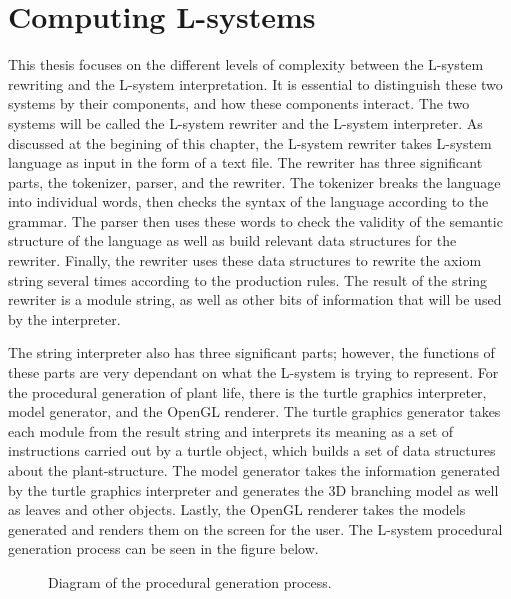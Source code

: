 \section{Computing L-systems}

This thesis focuses on the different levels of complexity between the L-system rewriting and the L-system interpretation. It is essential to distinguish these two systems by their components, and how these components interact. The two systems will be called the L-system rewriter and the L-system interpreter. As discussed at the begining of this chapter, the L-system rewriter takes L-system language as input in the form of a text file. The rewriter has three significant parts, the tokenizer, parser, and the rewriter. The tokenizer breaks the language into individual words, then checks the syntax of the language according to the grammar. The parser then uses these words to check the validity of the semantic structure of the language as well as build relevant data structures for the rewriter. Finally, the rewriter uses these data structures to rewrite the axiom string several times according to the production rules. The result of the string rewriter is a module string, as well as other bits of information that will be used by the interpreter. 

The string interpreter also has three significant parts; however, the functions of these parts are very dependant on what the L-system is trying to represent. For the procedural generation of plant life, there is the turtle graphics interpreter, model generator, and the OpenGL renderer. The turtle graphics generator takes each module from the result string and interprets its meaning as a set of instructions carried out by a turtle object, which builds a set of data structures about the plant-structure. The model generator takes the information generated by the turtle graphics interpreter and generates the 3D branching model as well as leaves and other objects. Lastly, the OpenGL renderer takes the models generated and renders them on the screen for the user. The L-system procedural generation process can be seen in the figure below.

\begin{figure}[htbp]
	{\centering
		\setlength{\fboxrule}{1pt}
		\vspace{7px}
		\caption{Diagram of the procedural generation process.}
	}
\end{figure}
\FloatBarrier

